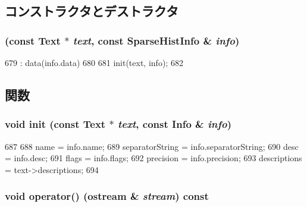 \subsection{コンストラクタとデストラクタ}
\hypertarget{structStats_1_1SparseHistPrint_a04cfb81bcde7fdec680e3456ebcde82b}{
\subsubsection[{SparseHistPrint}]{ (const {\bf Text} $\ast$ {\em text}, \/  const {\bf SparseHistInfo} \& {\em info})}}
\label{structStats_1_1SparseHistPrint_a04cfb81bcde7fdec680e3456ebcde82b}



\begin{DoxyCode}
679     : data(info.data)
680 {
681     init(text, info);
682 }
\end{DoxyCode}


\subsection{関数}
\hypertarget{structStats_1_1SparseHistPrint_a5c205569f811ccef04fc7ddaf47e3add}{
\subsubsection[{init}]{\setlength{\rightskip}{0pt plus 5cm}void init (const {\bf Text} $\ast$ {\em text}, \/  const {\bf Info} \& {\em info})}}
\label{structStats_1_1SparseHistPrint_a5c205569f811ccef04fc7ddaf47e3add}



\begin{DoxyCode}
687 {
688     name = info.name;
689     separatorString = info.separatorString;
690     desc = info.desc;
691     flags = info.flags;
692     precision = info.precision;
693     descriptions = text->descriptions;
694 }
\end{DoxyCode}
\hypertarget{structStats_1_1SparseHistPrint_ab796867ec17c9aaf14b8e44923fc17e4}{
\subsubsection[{operator()}]{\setlength{\rightskip}{0pt plus 5cm}void operator() (ostream \& {\em stream}) const}}
\label{structStats_1_1SparseHistPrint_ab796867ec17c9aaf14b8e44923fc17e4}



